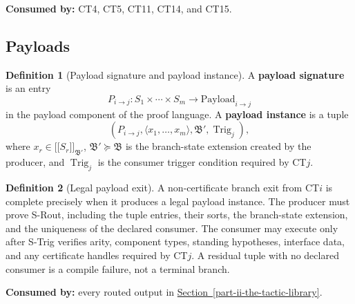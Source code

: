 \documentclass[
  11pt,
]{article}
\providecommand{\llbracket}{\mathopen{[\![}}
\providecommand{\rrbracket}{\mathclose{]\!]}}
\theoremstyle{definition}
\newtheorem{definition}{Definition}[section]
\newcommand{\secref}[1]{\hyperref[#1]{Section~\ref*{#1}}}
\begin{document}
\noindent\textbf{Consumed by:} CT4, CT5, CT11, CT14, and CT15.

\subsection{Payloads}\label{data-payloads}
\begin{definition}[Payload signature and payload instance]\label{def:payload-instance}
A \textbf{payload signature} is an entry
\[
P_{i\to j}:S_1\times\cdots\times S_m\longrightarrow
\mathrm{Payload}_{i\to j}
\]
in the payload component of the proof language.  A \textbf{payload
instance} is a tuple
\[
(P_{i\to j},\langle x_1,\ldots,x_m\rangle,\mathfrak B',
  \operatorname{Trig}_{j}),
\]
where \(x_r\in\llbracket S_r\rrbracket_{\mathfrak B'}\),
\(\mathfrak B'\succeq\mathfrak B\) is the branch-state extension
created by the producer, and \(\operatorname{Trig}_{j}\) is the
consumer trigger condition required by CT\(j\).
\end{definition}

\begin{definition}[Legal payload exit]\label{def:legal-payload-exit}
A non-certificate branch exit from CT\(i\) is complete precisely when it
produces a legal payload instance.  The producer must prove S-Rout,
including the tuple entries, their sorts, the branch-state extension,
and the uniqueness of the declared consumer.  The consumer may execute
only after S-Trig verifies arity, component types, standing hypotheses,
interface data, and any certificate handles required by CT\(j\).  A
residual tuple with no declared consumer is a compile failure, not a
terminal branch.
\end{definition}

\noindent\textbf{Consumed by:} every routed output in
\secref{part-ii-the-tactic-library}.
\end{document}
